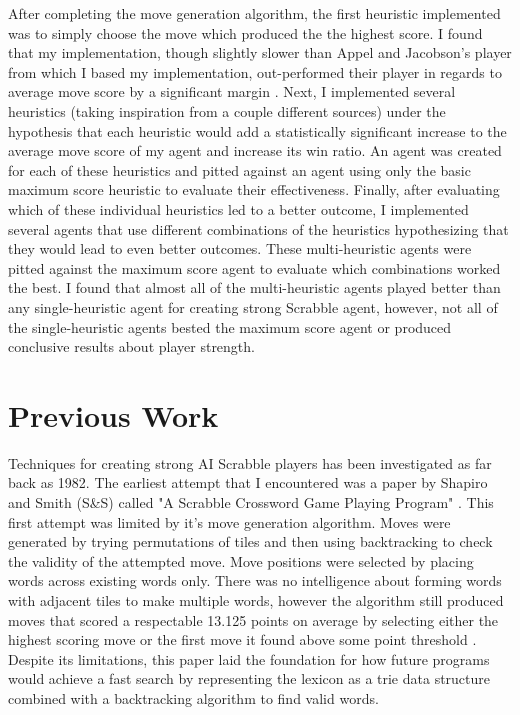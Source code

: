 \documentclass[letterpaper]{article}
\begin{document}
After completing the move generation algorithm, the first heuristic implemented was to simply choose the move which produced the the highest score. I found that my implementation, though slightly slower than Appel and Jacobson's player from which I based my implementation, out-performed their player in regards to average move score by a significant margin \cite{Appel1988}. Next, I implemented several heuristics (taking inspiration from a couple different sources) under the hypothesis that each heuristic would add a statistically significant increase to the average move score of my agent and increase its win ratio. An agent was created for each of these heuristics and pitted against an agent using only the basic maximum score heuristic to evaluate their effectiveness. Finally, after evaluating which of these individual heuristics led to a better outcome, I implemented several agents that use different combinations of the heuristics hypothesizing that they would lead to even better outcomes. These multi-heuristic agents were pitted against the maximum score agent to evaluate which combinations worked the best. I found that almost all of the multi-heuristic agents played better than any single-heuristic agent for creating strong Scrabble agent, however, not all of the single-heuristic agents bested the maximum score agent or produced conclusive results about player strength.

\section{Previous Work}
Techniques for creating strong AI Scrabble players has been investigated as far back as 1982. The earliest attempt that I encountered was a paper by Shapiro and Smith (S\&S) called "A Scrabble Crossword Game Playing Program" \cite{Shapiro1982}. This first attempt was limited by it's move generation algorithm. Moves were generated by trying permutations of tiles and then using backtracking to check the validity of the attempted move. Move positions were selected by placing words across existing words only. There was no intelligence about forming words with adjacent tiles to make multiple words, however the algorithm still produced moves that scored a respectable 13.125 points on average by selecting either the highest scoring move or the first move it found above some point threshold \cite{Shapiro1982}. Despite its limitations, this paper laid the foundation for how future programs would achieve a fast search by representing the lexicon as a trie data structure combined with a backtracking algorithm to find valid words.
\end{document}

